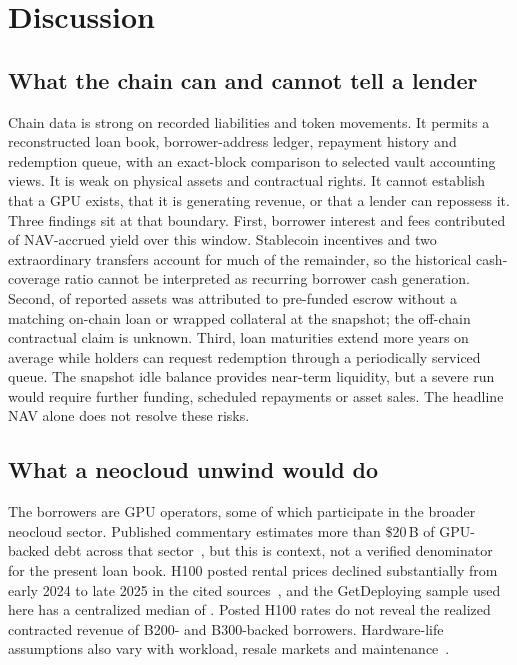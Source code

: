 \section{Discussion}\label{sec:disc}

\subsection{What the chain can and cannot tell a lender}
Chain data is strong on recorded liabilities and token movements. It permits a reconstructed loan book, borrower-address ledger, repayment history and redemption queue, with an exact-block comparison to selected vault accounting views. It is weak on physical assets and contractual rights. It cannot establish that a GPU exists, that it is generating revenue, or that a lender can repossess it. Three findings sit at that boundary. First, borrower interest and fees contributed \KappaBorrowers{} of NAV-accrued yield over this window. Stablecoin incentives and two extraordinary transfers account for much of the remainder, so the historical \CashCoverage{} cash-coverage ratio cannot be interpreted as recurring borrower cash generation. Second, \DTShare{} of reported assets was attributed to pre-funded escrow without a matching on-chain loan or wrapped collateral at the snapshot; the off-chain contractual claim is unknown. Third, loan maturities extend \YearsToMaturity{} more years on average while holders can request redemption through a periodically serviced queue. The snapshot idle balance provides near-term liquidity, but a severe run would require further funding, scheduled repayments or asset sales. The headline NAV alone does not resolve these risks.

\subsection{What a neocloud unwind would do}\label{sec:unwind}
The borrowers are GPU operators, some of which participate in the broader neocloud sector. Published commentary estimates more than \$20\,B of GPU-backed debt across that sector~\cite{friedman2025}, but this is context, not a verified denominator for the present loan book. H100 posted rental prices declined substantially from early 2024 to late 2025 in the cited sources~\cite{friedman2025}, and the GetDeploying sample used here has a centralized median of \CentralH{}. Posted H100 rates do not reveal the realized contracted revenue of B200- and B300-backed borrowers. Hardware-life assumptions also vary with workload, resale markets and maintenance~\cite{cerron2026gpu}.

